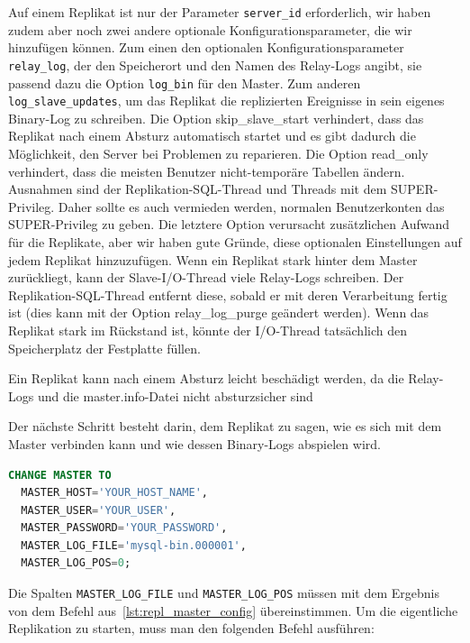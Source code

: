 Auf einem Replikat ist nur der Parameter \texttt{server\_id} erforderlich, wir haben zudem aber noch zwei andere optionale Konfigurationsparameter, die wir hinzufügen können.
Zum einen den optionalen Konfigurationsparameter \texttt{relay\_log}, der den Speicherort und den Namen des Relay-Logs angibt, sie passend dazu die Option \texttt{log\_bin} für den Master.
Zum anderen \texttt{log\_slave\_updates}, um das Replikat die replizierten Ereignisse in sein eigenes Binary-Log zu schreiben.
Die Option skip\_slave\_start verhindert, dass das Replikat nach einem Absturz automatisch startet und es gibt dadurch die Möglichkeit, den Server bei Problemen zu reparieren.
Die Option read\_only verhindert, dass die meisten Benutzer nicht-temporäre Tabellen ändern.
Ausnahmen sind der Replikation-SQL-Thread und Threads mit dem SUPER-Privileg.
Daher sollte es auch vermieden werden, normalen Benutzerkonten das SUPER-Privileg zu geben.
Die letztere Option verursacht zusätzlichen Aufwand für die Replikate, aber wir haben gute Gründe, diese optionalen Einstellungen auf jedem Replikat hinzuzufügen.
Wenn ein Replikat stark hinter dem Master zurückliegt, kann der Slave-I/O-Thread viele Relay-Logs schreiben.
Der Replikation-SQL-Thread entfernt diese, sobald er mit deren Verarbeitung fertig ist (dies kann mit der Option relay\_log\_purge geändert werden).
Wenn das Replikat stark im Rückstand ist, könnte der I/O-Thread tatsächlich den Speicherplatz der Festplatte füllen.

Ein Replikat kann nach einem Absturz leicht beschädigt werden, da die Relay-Logs und die master.info-Datei nicht absturzsicher sind

Der nächste Schritt besteht darin, dem Replikat zu sagen, wie es sich mit dem Master verbinden kann und wie dessen Binary-Logs abspielen wird.

\vspace{-5pt}
\begin{lstlisting}[language=SQL,caption=Verbindung der Replica zum Master,label={lst:repl_con_replica_master}]
CHANGE MASTER TO
  MASTER_HOST='YOUR_HOST_NAME',
  MASTER_USER='YOUR_USER',
  MASTER_PASSWORD='YOUR_PASSWORD',
  MASTER_LOG_FILE='mysql-bin.000001',
  MASTER_LOG_POS=0;
\end{lstlisting}
\vspace{-5pt}

Die Spalten \texttt{MASTER\_LOG\_FILE} und \texttt{MASTER\_LOG\_POS} müssen mit dem Ergebnis von dem Befehl aus~\ref{lst:repl_master_config} übereinstimmen.
Um die eigentliche Replikation zu starten, muss man den folgenden Befehl ausführen:

